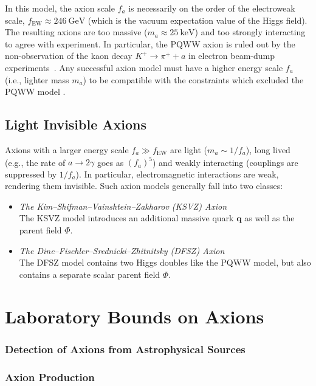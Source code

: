 In this model, the axion scale $f_a$ is necessarily on the order of the electroweak scale, $f_\text{EW} \approx \SI{246}{\giga\eV}$ (which is the vacuum expectation value of the Higgs field).
The resulting axions are too massive ($m_a \approx \SI{25}{\kilo\eV}$) and too strongly interacting to agree with experiment.
In particular, the PQWW axion is ruled out by the non-observation of the kaon decay $K^+ \to π^+ + a$ in electron beam-dump experiments\footnotemark\ \cite{Peccei_1996,riordan1987search}.
Any successful axion model must have a higher energy scale $f_a$ (i.e., lighter mass $m_a$) to be compatible with the constraints which excluded the PQWW model \cite{Marsh_2016}.


\subsection{Light Invisible Axions}

Axions with a larger energy scale $f_a \gg f_\text{EW}$ are light ($m_a \sim 1/f_a$), long lived (e.g., the rate of $a \to 2γ$ goes as $(f_a)^5$) and weakly interacting (couplings are suppressed by $1/f_a$).
In particular, electromagnetic interactions are weak, rendering them invisible.
Such axion models generally fall into two classes: \cite{Peccei_1996,Marsh_2016}
\begin{itemize}
	\item \textit{The Kim--Shifman--Vainshtein--Zakharov (KSVZ) Axion} \\
	The KSVZ model introduces an additional massive quark $\bm q$ as well as the parent field $Φ$.
	\item \textit{The Dine--Fischler--Srednicki--Zhitnitsky (DFSZ) Axion} \\
	The DFSZ model contains two Higgs doubles like the PQWW model, but also contains a separate scalar parent field $Φ$.
\end{itemize}


\section{Laboratory Bounds on Axions}

\subsubsection{Detection of Axions from Astrophysical Sources}

\subsubsection{Axion Production}